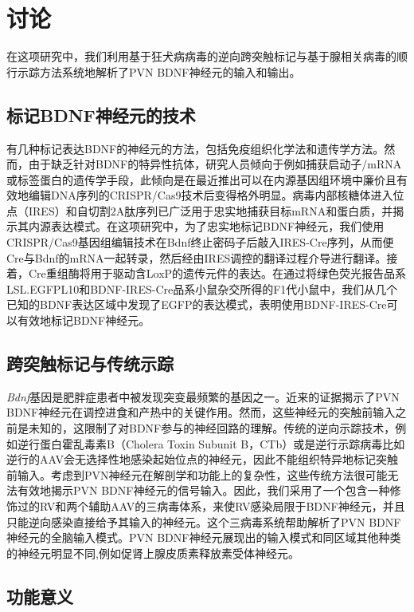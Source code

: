 \chapter{讨论}\label{chap:discussion}
在这项研究中，我们利用基于狂犬病病毒的逆向跨突触标记与基于腺相关病毒的顺行示踪方法系统地解析了PVN BDNF神经元的输入和输出。

\section{标记BDNF神经元的技术}
有几种标记表达BDNF的神经元的方法，包括免疫组织化学法和遗传学方法。然而，由于缺乏针对BDNF的特异性抗体，研究人员倾向于例如捕获启动子/mRNA或标签蛋白的遗传学手段，此倾向是在最近推出可以在内源基因组环境中廉价且有效地编辑DNA序列的CRISPR/Cas9技术后\citep{ran2013genome, doudna2014new}变得格外明显。病毒内部核糖体进入位点（IRES）和自切割2A肽序列已广泛用于忠实地捕获目标mRNA和蛋白质，并揭示其内源表达模式\citep{vong2011leptin, daigle2018suite}。在这项研究中，为了忠实地标记BDNF神经元，我们使用CRISPR/Cas9基因组编辑技术在Bdnf终止密码子后敲入IRES-Cre序列，从而便Cre与Bdnf的mRNA一起转录，然后经由IRES调控的翻译过程介导进行翻译。接着，Cre重组酶将用于驱动含LoxP的遗传元件的表达。在通过将绿色荧光报告品系LSL.EGFPL10和BDNF-IRES-Cre品系小鼠杂交所得的F1代小鼠中，我们从几个已知的BDNF表达区域中发现了EGFP的表达模式，表明使用BDNF-IRES-Cre可以有效地标记BDNF神经元。

\section{跨突触标记与传统示踪}
\textit{Bdnf}基因是肥胖症患者中被发现突变最频繁的基因之一。近来的证据揭示了PVN BDNF神经元在调控进食和产热中的关键作用。然而，这些神经元的突触前输入之前是未知的，这限制了对BDNF参与的神经回路的理解。传统的逆向示踪技术，例如逆行蛋白霍乱毒素B（Cholera Toxin Subunit B，CTb）\citep{conte2009multiple}或是逆行示踪病毒比如逆行的AAV\citep{tervo2016designer}会无选择性地感染起始位点的神经元，因此不能组织特异地标记突触前输入。考虑到PVN神经元在解剖学和功能上的复杂性，这些传统方法很可能无法有效地揭示PVN BDNF神经元的信号输入。因此，我们采用了一个包含一种修饰过的RV和两个辅助AAV的三病毒体系，来使RV感染局限于BDNF神经元，并且只能逆向感染直接给予其输入的神经元。这个三病毒系统帮助解析了PVN BDNF神经元的全脑输入模式。PVN BDNF神经元展现出的输入模式和同区域其他种类的神经元明显不同,例如促肾上腺皮质素释放素受体神经元\citep{jiang2018local}。

\section{功能意义}


